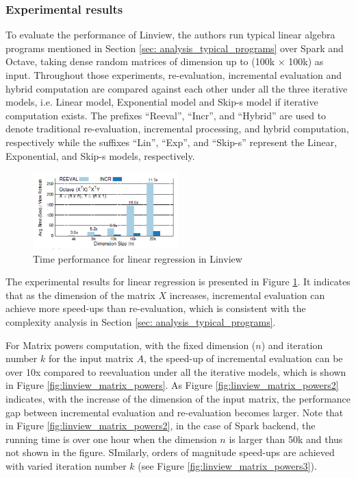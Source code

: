 \subsubsection{Experimental results}
To evaluate the performance of Linview, the authors run typical linear algebra programs mentioned in Section \ref{sec: analysis_typical_programs} over Spark and Octave, taking dense random matrices of dimension up to (100k $\times$ 100k) as input. Throughout those experiments, re-evaluation, incremental evaluation and hybrid computation are compared against each other under all the three iterative models, i.e. Linear model, Exponential model and Skip-s model if iterative computation exists. The prefixes ``Reeval'', ``Incr'', and ``Hybrid'' are used to denote traditional re-evaluation, incremental processing, and hybrid computation, respectively while the suffixes ``Lin'', ``Exp'', and ``Skip-s'' represent the Linear, Exponential, and Skip-s models, respectively.

\begin{figure}
    \centering
    \includegraphics[height = 0.25\textwidth, width=0.5\textwidth]{Figures/linview_regression_exp.png}
    \caption{Time performance for linear regression in Linview}
    \label{fig:linview_linear_regression}
\end{figure}


The experimental results for linear regression is presented in Figure \ref{fig:linview_linear_regression}. It indicates that as the dimension of the matrix $X$ increases, incremental evaluation can achieve more speed-ups than re-evaluation, which is consistent with the complexity analysis in Section \ref{sec: analysis_typical_programs}.

For Matrix powers computation, with the fixed dimension ($n$) and iteration number $k$ for the input matrix $A$, the speed-up of incremental evaluation can be over 10x compared to reevaluation under all the iterative models, which is shown in Figure \ref{fig:linview_matrix_powers}. As Figure \ref{fig:linview_matrix_powers2} indicates, with the increase of the dimension of the input matrix, the performance gap between incremental evaluation and re-evaluation becomes larger. Note that in Figure \ref{fig:linview_matrix_powers2}, in the case of Spark backend, the running time is over one hour when the dimension $n$ is larger than 50k and thus not shown in the figure. SImilarly, orders of magnitude speed-ups are achieved with varied iteration number $k$ (see Figure \ref{fig:linview_matrix_powers3}).

